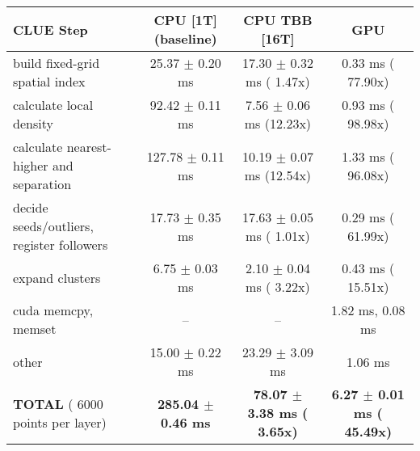     \begin{tabular}{l|c|c|c}
    \hline
    CLUE Step                                 & CPU [1T] (baseline)         & CPU TBB [16T]                         & GPU                       \\ \hline
    build fixed-grid spatial index            &  25.37 $\pm$  0.20 ms       &  17.30 $\pm$  0.32 ms ( 1.47x)        &   0.33 ms ( 77.90x)       \\
    calculate local density                   &  92.42 $\pm$  0.11 ms       &   7.56 $\pm$  0.06 ms (12.23x)        &   0.93 ms ( 98.98x)       \\
    calculate nearest-higher and separation   & 127.78 $\pm$  0.11 ms       &  10.19 $\pm$  0.07 ms (12.54x)        &   1.33 ms ( 96.08x)       \\
    decide seeds/outliers, register followers &  17.73 $\pm$  0.35 ms       &  17.63 $\pm$  0.05 ms ( 1.01x)        &   0.29 ms ( 61.99x)       \\
    expand clusters                           &   6.75 $\pm$  0.03 ms       &   2.10 $\pm$  0.04 ms ( 3.22x)        &   0.43 ms ( 15.51x)       \\ \hline
    cuda memcpy, memset                       & --                          & --                                    &   1.82 ms,   0.08 ms      \\ 
    other                                     &  15.00 $\pm$  0.22 ms       &  23.29 $\pm$  3.09 ms                 &   1.06 ms                 \\ \hline
    \textbf{TOTAL} ( 6000 points per layer)   & \textbf{285.04 $\pm$  0.46 ms} & \textbf{ 78.07 $\pm$  3.38 ms ( 3.65x)} & \textbf{  6.27 $\pm$  0.01 ms ( 45.49x)}  \\
    \hline 
    \end{tabular}
    \linebreak


